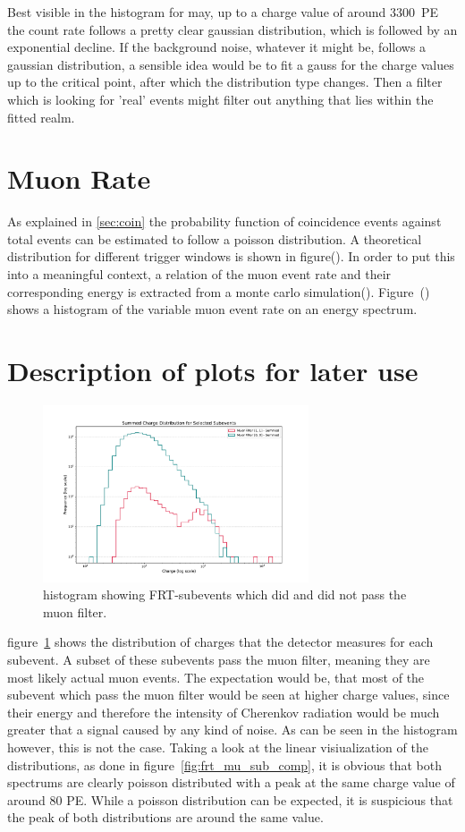 Best visible in the histogram for may, up to a charge value of around \SI{3300}{PE} the count rate follows a pretty clear gaussian distribution, which is followed 
by an exponential decline. If the background noise, whatever it might be, follows a gaussian distribution, a sensible idea would be to fit a gauss for the charge 
values up to the critical point, after which the distribution type changes. Then a filter which is looking for 'real' events might filter out anything that lies 
within the fitted realm. 

\section{Muon Rate}

As explained in \ref{sec:coin} the probability function of coincidence events against total events can be estimated to follow a poisson distribution.
A theoretical distribution for different trigger windows is shown in figure(). In order to put this into a meaningful context, a relation of the muon event rate and their 
corresponding energy is extracted from a monte carlo simulation(). Figure~() shows a histogram of the variable muon event rate on an energy spectrum. 

\section{Description of plots for later use}
\begin{figure}
    \centering
    \includegraphics[width=0.7\textwidth]{Plots/frt_muon_filter_sub.pdf}
    \caption{histogram showing FRT-subevents which did and did not pass the muon filter.}
    \label{fig:frt_mu_sub}
\end{figure}

figure~\ref{fig:frt_mu_sub} shows the distribution of charges that the detector measures for each subevent. A subset of these subevents pass the muon filter, 
meaning they are most likely actual muon events. The expectation would be, that most of the subevent which pass the muon filter would be seen at higher charge values,
since their energy and therefore the intensity of Cherenkov radiation would be much greater that a signal caused by any kind of noise. As can be seen in the 
histogram however, this is not the case. Taking a look at the linear visiualization of the distributions, as done in figure~\ref{fig:frt_mu_sub_comp}, it is obvious that 
both spectrums are clearly poisson distributed with a peak at the same charge value of around 80 PE. While a poisson distribution can be expected, it is 
suspicious that the peak of both distributions are around the same value. 

